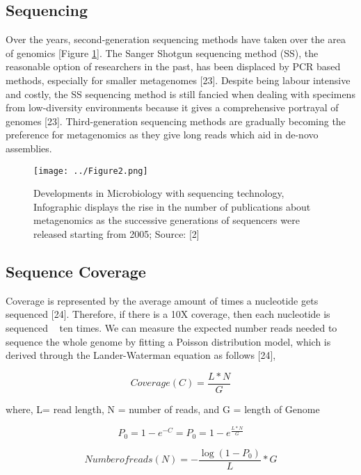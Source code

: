 \subsection{Sequencing}
Over the years, second-generation sequencing methods have taken over the area of genomics [Figure \ref{fig:figure2}]. The Sanger Shotgun sequencing method (SS), the reasonable option of researchers in the past, has been displaced by PCR based methods, especially for smaller metagenomes [23]. Despite being labour intensive and costly, the SS sequencing method is still fancied when dealing with specimens from low-diversity environments because it gives a comprehensive portrayal of genomes [23]. Third-generation sequencing methods are gradually becoming the preference for metagenomics as they give long reads which aid in de-novo assemblies.

\begin{figure}
  \centering
  \texttt{[image: ../Figure2.png]}
  \caption{Developments in Microbiology with sequencing technology, Infographic displays the rise in the number of publications about metagenomics as the successive generations of sequencers were released starting from 2005; Source: [2]}
  \label{fig:figure2}
\end{figure}

\subsection{Sequence Coverage}
Coverage is represented by the average amount of times a nucleotide gets sequenced [24]. Therefore, if there is a 10X coverage, then each nucleotide is sequenced ~ ten times. We can measure the expected number reads needed to sequence the whole genome by fitting a Poisson distribution model, which is derived through the Lander-Waterman equation as follows [24],

\begin{equation} 
  Coverage (C) = \frac{L * N}{G}
  \label{eq:eq1}
\end{equation}

where, L= read length, N = number of reads, and G = length of Genome

\begin{equation} 
  P_{0} = 1 - e^{-C} = P_{0} = 1 - e^{\frac{L * N}{G}}
  \label{eq:eq2}
\end{equation}

\begin{equation} 
  Number  of reads (N) = -\frac{\log(1-P_{0})}{L}* G
  \label{eq:eq3}
\end{equation}

